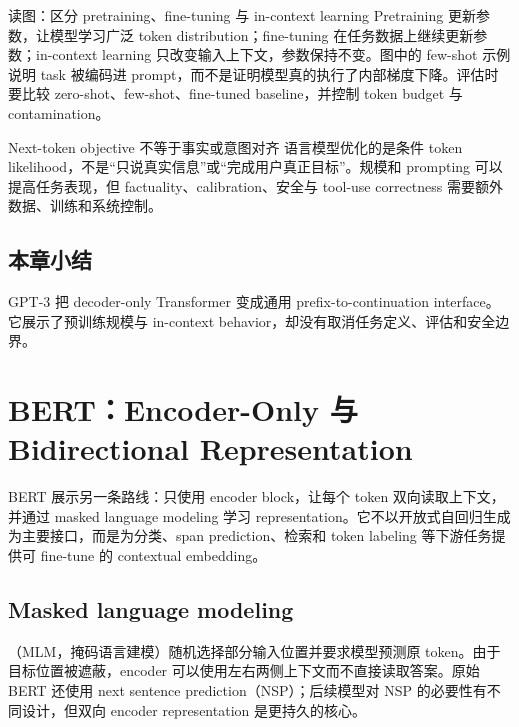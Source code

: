 \documentclass[a4paper]{article}
\begin{document}
\begin{knowledgebox}{读图：区分 pretraining、fine-tuning 与 in-context learning}
Pretraining 更新参数，让模型学习广泛 token distribution；fine-tuning 在任务数据上继续更新参数；in-context learning 只改变输入上下文，参数保持不变。图中的 few-shot 示例说明 task 被编码进 prompt，而不是证明模型真的执行了内部梯度下降。评估时要比较 zero-shot、few-shot、fine-tuned baseline，并控制 token budget 与 contamination。
\end{knowledgebox}


\begin{warningbox}{Next-token objective 不等于事实或意图对齐}
语言模型优化的是条件 token likelihood，不是“只说真实信息”或“完成用户真正目标”。规模和 prompting 可以提高任务表现，但 factuality、calibration、安全与 tool-use correctness 需要额外数据、训练和系统控制。
\end{warningbox}

\subsection{本章小结}

GPT-3 把 decoder-only Transformer 变成通用 prefix-to-continuation interface。它展示了预训练规模与 in-context behavior，却没有取消任务定义、评估和安全边界。

\section{BERT：Encoder-Only 与 Bidirectional Representation}

BERT 展示另一条路线：只使用 encoder block，让每个 token 双向读取上下文，并通过 masked language modeling 学习 representation。它不以开放式自回归生成为主要接口，而是为分类、span prediction、检索和 token labeling 等下游任务提供可 fine-tune 的 contextual embedding。

\subsection{Masked language modeling}

（MLM，掩码语言建模）随机选择部分输入位置并要求模型预测原 token。由于目标位置被遮蔽，encoder 可以使用左右两侧上下文而不直接读取答案。原始 BERT 还使用 next sentence prediction（NSP）；后续模型对 NSP 的必要性有不同设计，但双向 encoder representation 是更持久的核心。
\end{document}
